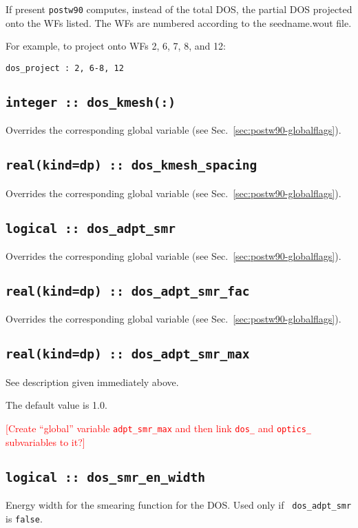 If present {\tt postw90} computes, instead of the total DOS, the
partial DOS projected onto the WFs listed. The WFs are numbered
according to the seedname.wout file.

For example, to project onto WFs 2, 6, 7, 8, and 12:

{\tt dos\_project : 2, 6-8, 12}


\subsection[dos\_kmesh]{\tt integer :: dos\_kmesh(:)}
Overrides the corresponding global variable (see Sec.~\ref{sec:postw90-globalflags}).

\subsection[dos\_kmesh\_spacing]{\tt real(kind=dp) :: dos\_kmesh\_spacing}
Overrides the corresponding global variable (see Sec.~\ref{sec:postw90-globalflags}).

\subsection[dos\_adpt\_smr]{\tt logical :: dos\_adpt\_smr}
Overrides the corresponding global variable (see Sec.~\ref{sec:postw90-globalflags}).

\subsection[dos\_adpt\_smr\_fac]{\tt real(kind=dp) :: dos\_adpt\_smr\_fac}
Overrides the corresponding global variable (see
Sec.~\ref{sec:postw90-globalflags}).

\subsection[dos\_adpt\_smr\_max]{\tt real(kind=dp) ::
  dos\_adpt\_smr\_max}

See description given immediately above.

The default value is 1.0.

\textcolor{red}{[Create ``global'' variable {\tt adpt\_smr\_max} and then link
{\tt dos\_} and {\tt optics\_} subvariables to it?]}

\subsection[dos\_smr\_en\_width]{\tt logical :: dos\_smr\_en\_width}
Energy width for the smearing function for the DOS. Used only if {\tt
  dos\_adpt\_smr} is \verb#false#.

